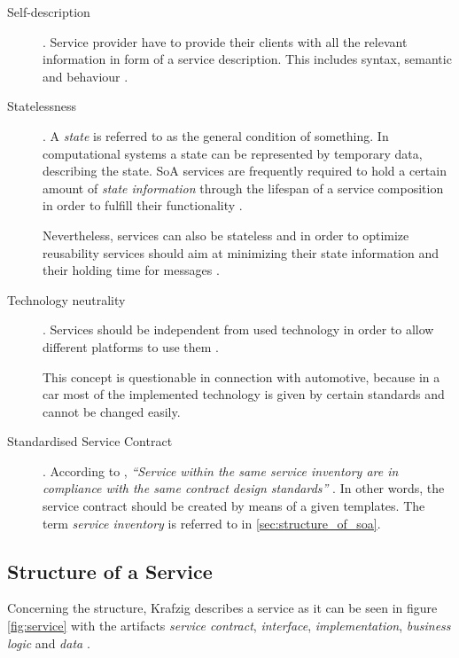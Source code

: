 \begin{description}
\item [Self-description].
Service provider have to provide their clients with all the relevant information in form of a service description. This includes syntax, semantic and behaviour \cite{breivold}.

\item [Statelessness].
A \emph{state} is referred to as the general condition of something. In computational systems a state can be represented by temporary data, describing the state. SoA services are frequently required to hold a certain amount of \emph{state information} through the lifespan of a service composition in order to fulfill their functionality \cite[ch.11]{erl2008}. 

Nevertheless, services can also be stateless and in order to optimize reusability services should aim at minimizing their state information and their holding time for messages \cite{breivold} \cite[p.27]{erl2011}.

\item [Technology neutrality].
Services should be independent from used technology in order to allow different platforms to use them \cite{breivold}. 

This concept is questionable in connection with automotive, because in a car most of the implemented technology is given by certain standards and cannot be changed easily.

\item [Standardised Service Contract].
According to \cite{erl2011}, \emph{``Service within the same service inventory are in compliance with the same contract design standards''} \cite[p.27]{erl2011}. In other words, the service contract should be created by means of a given templates. The term \emph{service inventory} is referred to in \ref{sec:structure_of_soa}.
\end{description}



\subsection{Structure of a Service}
\label{sec:service_structure}
Concerning the structure, Krafzig describes a service as it can be seen in figure \ref{fig:service} with the artifacts \emph{service contract}, \emph{interface}, \emph{implementation}, \emph{business logic} and \emph{data} \cite[p.44]{krafzig}.

